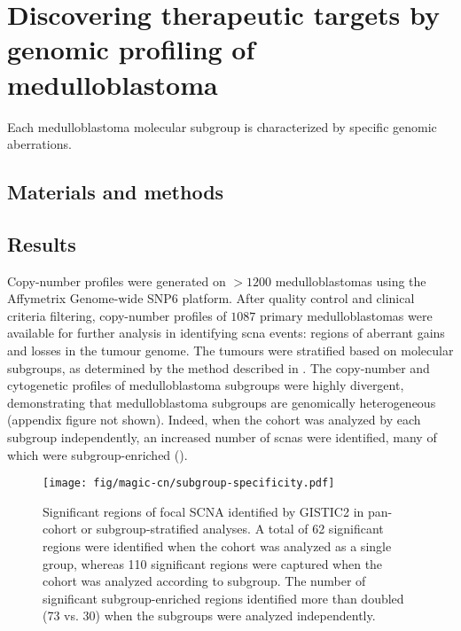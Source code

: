 \chapter{Discovering therapeutic targets by genomic profiling of medulloblastoma}

\begin{hypothesis}
Each medulloblastoma molecular subgroup is characterized by specific genomic aberrations.
\end{hypothesis}

\section{Materials and methods}

\section{Results}

Copy-number profiles were generated on $> 1200$ medulloblastomas using the Affymetrix Genome-wide SNP6 platform. After quality control and clinical criteria filtering, copy-number profiles of $1087$ primary medulloblastomas were available for further analysis in identifying \gls{scna} events: regions of aberrant gains and losses in the tumour genome. The tumours were stratified based on molecular subgroups, as determined by the method described in . The copy-number and cytogenetic profiles of medulloblastoma subgroups were highly divergent, demonstrating that medulloblastoma subgroups are genomically heterogeneous (appendix figure not shown). Indeed, when the cohort was analyzed by each subgroup independently, an increased number of \gls{scnas} were identified, many of which were subgroup-enriched ().

\begin{SCfigure}[5]
	\centering
	\texttt{[image: fig/magic-cn/subgroup-specificity.pdf]}
	\caption[Significant regions of focal SCNA identified by GISTIC2]
	{
	Significant regions of focal SCNA identified by GISTIC2 in pan-cohort or subgroup-stratified analyses.
	A total of 62 significant regions were identified when the cohort was analyzed as a single group, whereas 110 significant regions were captured when the cohort was analyzed according to subgroup. The number of significant subgroup-enriched regions identified more than doubled (73 vs. 30) when the subgroups were analyzed independently.
	}
	\label{fig:subgroup-specificity}
\end{SCfigure}

